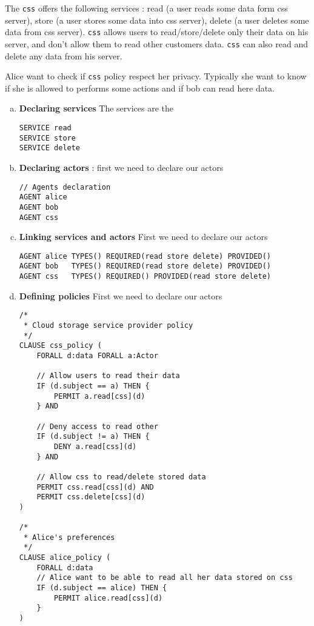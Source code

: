 The \texttt{css} offers the following services : read (a user reads some data form css server),
store (a user stores some data into css server), delete (a user deletes some data from css server).
\texttt{css} allows users to read/store/delete only their data on his server, and don't allow them to read other
customers data. \texttt{css} can also read and delete any data from his server.

Alice want to check if \texttt{css} policy respect her privacy. Typically she want to know if she is allowed to
performs some actions and if bob can read here data.


\begin{enumerate}[a.]

    \item \textbf{Declaring services}
The services are the
\begin{lstlisting}
SERVICE read
SERVICE store
SERVICE delete
\end{lstlisting}

    \item \textbf{Declaring actors} : first we need to declare our actors
\begin{lstlisting}
// Agents declaration
AGENT alice
AGENT bob
AGENT css
\end{lstlisting}

    \item \textbf{Linking services and actors}
First we need to declare our actors
\begin{lstlisting}
AGENT alice TYPES() REQUIRED(read store delete) PROVIDED()
AGENT bob   TYPES() REQUIRED(read store delete) PROVIDED()
AGENT css   TYPES() REQUIRED() PROVIDED(read store delete)
\end{lstlisting}


    \item \textbf{Defining policies}
First we need to declare our actors
\begin{lstlisting}
/*
 * Cloud storage service provider policy
 */
CLAUSE css_policy (
    FORALL d:data FORALL a:Actor

    // Allow users to read their data
    IF (d.subject == a) THEN {
        PERMIT a.read[css](d)
    } AND

    // Deny access to read other
    IF (d.subject != a) THEN {
        DENY a.read[css](d)
    } AND

    // Allow css to read/delete stored data
    PERMIT css.read[css](d) AND
    PERMIT css.delete[css](d)
)

/*
 * Alice's preferences
 */
CLAUSE alice_policy (
    FORALL d:data
    // Alice want to be able to read all her data stored on css
    IF (d.subject == alice) THEN {
        PERMIT alice.read[css](d)
    }
)
\end{lstlisting}


\end{enumerate}
